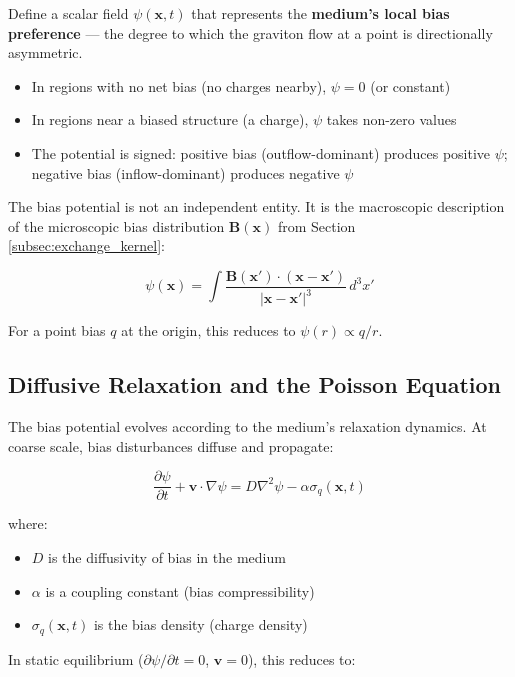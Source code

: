 \documentclass[12pt, a4paper]{article}
\begin{document}
Define a scalar field \( \psi(\mathbf{x}, t) \) that represents the \textbf{medium's local bias preference} — the degree to which the graviton flow at a point is directionally asymmetric.

\begin{itemize}
    \item In regions with no net bias (no charges nearby), \( \psi = 0 \) (or constant)
    \item In regions near a biased structure (a charge), \( \psi \) takes non-zero values
    \item The potential is signed: positive bias (outflow-dominant) produces positive \( \psi \); negative bias (inflow-dominant) produces negative \( \psi \)
\end{itemize}

The bias potential is not an independent entity. It is the macroscopic description of the microscopic bias distribution \( \mathbf{B}(\mathbf{x}) \) from Section \ref{subsec:exchange_kernel}:

\[
\psi(\mathbf{x}) = \int \frac{\mathbf{B}(\mathbf{x}') \cdot (\mathbf{x} - \mathbf{x}')}{|\mathbf{x} - \mathbf{x}'|^3} \, d^3x'
\]

For a point bias \( q \) at the origin, this reduces to \( \psi(r) \propto q/r \).

\subsection{Diffusive Relaxation and the Poisson Equation}
\label{subsec:poisson_equation}

The bias potential evolves according to the medium's relaxation dynamics. At coarse scale, bias disturbances diffuse and propagate:

\[
\frac{\partial \psi}{\partial t} + \mathbf{v} \cdot \nabla \psi = D \nabla^2 \psi - \alpha \sigma_q(\mathbf{x}, t)
\]

where:
\begin{itemize}
    \item \( D \) is the diffusivity of bias in the medium
    \item \( \alpha \) is a coupling constant (bias compressibility)
    \item \( \sigma_q(\mathbf{x}, t) \) is the bias density (charge density)
\end{itemize}

In static equilibrium (\( \partial \psi/\partial t = 0 \), \( \mathbf{v} = 0 \)), this reduces to:
\end{document}
